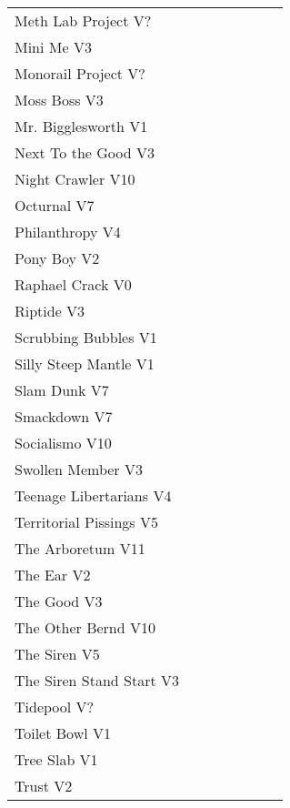\begin{center}
\begin{supertabular}{p{0.65\linewidth}r}
Meth Lab Project V? & \pageref{rt:Meth Lab Project} \\
Mini Me V3 & \pageref{rt:Mini Me} \\
Monorail Project V? & \pageref{rt:Monorail Project} \\
Moss Boss V3 & \pageref{rt:Moss Boss} \\
Mr. Bigglesworth V1 & \pageref{vr:Mr. Bigglesworth} \\
Next To the Good V3 & \pageref{rt:Next To the Good} \\
Night Crawler V10 & \pageref{rt:Night Crawler} \\
Octurnal V7 & \pageref{rt:Octurnal} \\
Philanthropy V4 & \pageref{rt:Philanthropy} \\
Pony Boy V2 & \pageref{rt:Pony Boy} \\
Raphael Crack V0 & \pageref{rt:Raphael Crack} \\
Riptide V3 & \pageref{rt:Riptide} \\
Scrubbing Bubbles V1 & \pageref{rt:Scrubbing Bubbles} \\
Silly Steep Mantle V1 & \pageref{rt:Silly Steep Mantle} \\
Slam Dunk V7 & \pageref{rt:Slam Dunk} \\
Smackdown V7 & \pageref{rt:Smackdown} \\
Socialismo V10 & \pageref{rt:Socialismo} \\
Swollen Member V3 & \pageref{rt:Swollen Member} \\
Teenage Libertarians V4 & \pageref{rt:Teenage Libertarians} \\
Territorial Pissings V5 & \pageref{rt:Territorial Pissings} \\
The Arboretum V11 & \pageref{rt:The Arboretum} \\
The Ear V2 & \pageref{rt:The Ear} \\
The Good V3 & \pageref{rt:The Good} \\
The Other Bernd V10 & \pageref{rt:The Other Bernd} \\
The Siren V5 & \pageref{rt:The Siren} \\
The Siren Stand Start V3 & \pageref{vr:The Siren Stand Start} \\
Tidepool V? & \pageref{rt:Tidepool} \\
Toilet Bowl V1 & \pageref{rt:Toilet Bowl} \\
Tree Slab V1 & \pageref{rt:Tree Slab} \\
Trust V2 & \pageref{rt:Trust} \\

\end{supertabular}
\end{center}

